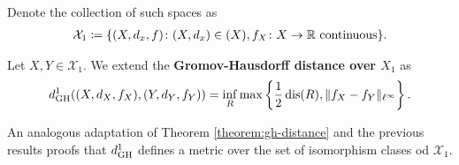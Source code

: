 Denote the collection of such spaces as
\begin{align}
    \mathcal{X}_1 \coloneq \{ (X, d_x, f) \colon (X, d_x) \in \mathcal(X), f_X \colon X \to \mathbb R \text{ continuous}\}.
\end{align}

\begin{definition} \label{def:dgh1}
    Let $ X, Y \in \mathcal{X}_1 $. We extend the {\bf Gromov-Hausdorff distance over $ X_1 $} as
    \begin{equation}
        d_{\operatorname{GH}}^1((X, d_X, f_X), (Y, d_Y, f_Y)) = \inf_{R} \max \left\{ \frac{1}{2} \operatorname{dis}(R), \|f_X - f_Y \|_{\ell^\infty} \right\}.   
    \end{equation}
\end{definition}

An analogous adaptation of Theorem \ref{theorem:gh-distance} and the previous results proofs that $ d_{\operatorname{GH}}^1 $ defines a metric over the set of isomorphism clases od $ \mathcal{X}_1 $.